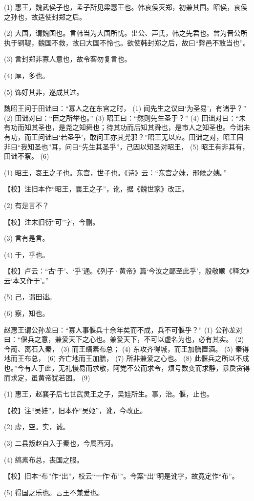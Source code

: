\documentclass[12pt,UTF8]{ctexbook}
\begin{document}
(1) 惠王，魏武侯子也，孟子所见梁惠王也。韩哀侯灭郑，初兼其国。昭侯，哀侯之孙也，故适使封郑之后。

(2) 大国，谓魏国也。言韩当为大国所忧。出公、声氏，韩之先君也。曾为晋公所执于铜鞮，魏国不救，故曰大国不怜也。欲使韩封郑之后，故曰“弊邑不敢当也”。

(3) 言封郑非寡人意也，故令客勿复言也。

(4) 厚，多也。

(5) 饰好其非，遂成其过。

魏昭王问于田诎曰：“寡人之在东宫之时， (1) 闻先生之议曰‘为圣易’，有诸乎？” (2) 田诎对曰：“臣之所举也。” (3) 昭王曰：“然则先生圣于？” (4) 田诎对曰：“未有功而知其圣也，是尧之知舜也；待其功而后知其舜也，是市人之知圣也。今诎未有功，而王问诎曰‘若圣乎’，敢问王亦其尧邪？”昭王无以应。田诎之对，昭王固非曰“我知圣也”耳，问曰“先生其圣乎”，己因以知圣对昭王， (5) 昭王有非其有，田诎不察。 (6)

(1) 昭王，哀王之子也。东宫，世子也。《诗》云：“东宫之妹，邢候之姨。”

【校】注旧本作“昭王，襄王之子”，讹，据《魏世家》改正。

(2) 有是言不？

【校】注末旧衍“可”字，今删。

(3) 言有是言。

(4) 于，乎也。

【校】卢云：“古‘于’、‘乎’通。《列子·黄帝》篇‘今汝之鄙至此乎’，殷敬顺《释文》云‘本又作于’。”

(5) 己，谓田诎。

(6) 察，知也。

赵惠王谓公孙龙曰：“寡人事偃兵十余年矣而不成，兵不可偃乎？” (1) 公孙龙对曰：“偃兵之意，兼爱天下之心也。兼爱天下，不可以虚名为也，必有其实。 (2) 今蔺、离石入秦， (3) 而王缟素布总； (4) 东攻齐得城，而王加膳置酒。 (5) 秦得地而王布总， (6) 齐亡地而王加膳， (7) 所非兼爱之心也。 (8) 此偃兵之所以不成也。”今有人于此，无礼慢易而求敬，阿党不公而求令，烦号数变而求静，暴戾贪得而求定，虽黄帝犹若困。 (9)

(1) 惠王，赵襄子后七世武灵王之子，吴娃所生。事，治。偃，止也。

【校】注“吴娃”，旧本作“吴姬”，讹，今改正。

(2) 虚，空。实，诚。

(3) 二县叛赵自入于秦也，今属西河。

(4) 缟素布总，丧国之服。

【校】旧本“布”作“出”，校云“一作‘布’”。今案“出”明是讹字，故竟定作“布”。

(5) 得国之乐也。言王不兼爱也。
\end{document}
